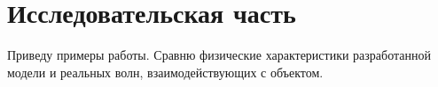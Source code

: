 \chapter{Исследовательская часть}

Приведу примеры работы. Сравню физические характеристики разработанной модели и реальных волн, взаимодействующих с объектом.
